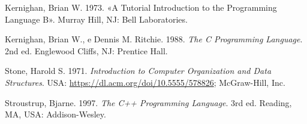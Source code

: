 \documentclass[
  letterpaper,
]{scrbook}
\newlength{\cslhangindent}
\newenvironment{CSLReferences}[2] %
 {\begin{list}{}{%
  \setlength{\itemindent}{0pt}
  \setlength{\leftmargin}{0pt}
  \setlength{\parsep}{0pt}
  \ifodd #1
   \setlength{\leftmargin}{\cslhangindent}
   \setlength{\itemindent}{-1\cslhangindent}
  \fi
  \setlength{\itemsep}{#2\baselineskip}}}
 {\end{list}}
\begin{document}

\label{refs}
\begin{CSLReferences}{1}{0}
Kernighan, Brian W. 1973. {«A Tutorial Introduction to the Programming
Language B»}. Murray Hill, NJ: Bell Laboratories.

Kernighan, Brian W., e Dennis M. Ritchie. 1988. \emph{The C Programming
Language}. 2nd ed. Englewood Cliffs, NJ: Prentice Hall.

Stone, Harold S. 1971. \emph{Introduction to Computer Organization and
Data Structures}. USA: \url{https://dl.acm.org/doi/10.5555/578826};
McGraw-Hill, Inc.

Stroustrup, Bjarne. 1997. \emph{The C++ Programming Language}. 3rd ed.
Reading, MA, USA: Addison-Wesley.

\end{CSLReferences}


\backmatter
\end{document}
